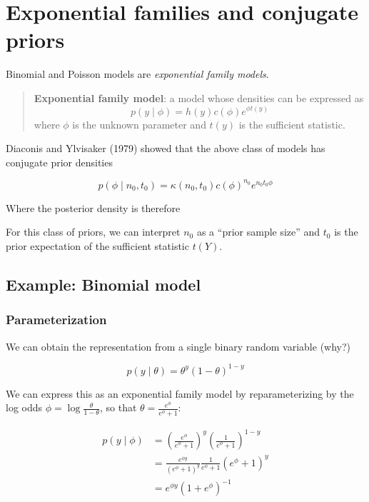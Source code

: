 \documentclass[]{article}
\begin{document}
\hypertarget{exponential-families-and-conjugate-priors}{%
\section{Exponential families and conjugate
priors}\label{exponential-families-and-conjugate-priors}}

Binomial and Poisson models are \emph{exponential family models}.

\begin{quote}
\textbf{Exponential family model}: a model whose densities can be
expressed as \[p(y \mid \phi) = h(y)c(\phi)e^{\phi t(y)}\] where
\(\phi\) is the unknown parameter and \(t(y)\) is the sufficient
statistic.
\end{quote}

Diaconis and Ylvisaker (1979) showed that the above class of models has
conjugate prior densities

\[p(\phi \mid n_0, t_0) = \kappa (n_0, t_0) c(\phi)^{n_0} e^{n_0 t_0 \phi}\]

Where the posterior density is therefore

For this class of priors, we can interpret \(n_0\) as a ``prior sample
size'' and \(t_0\) is the prior expectation of the sufficient statistic
\(t(Y)\).

\hypertarget{example-binomial-model}{%
\subsection{Example: Binomial model}\label{example-binomial-model}}

\hypertarget{parameterization}{%
\subsubsection{Parameterization}\label{parameterization}}

We can obtain the representation from a single binary random variable
(why?)

\[p(y \mid \theta) = \theta^{y} (1 - \theta)^{1 - y}\]

We can express this as an exponential family model by reparameterizing
by the log odds \(\phi = \log \frac{\theta}{1 - \theta}\), so that
\(\theta = \frac{e^\phi}{e^\phi + 1}\):

\begin{align}
p(y \mid \phi) &= \left( \frac{e^\phi}{e^\phi + 1} \right)^y \left(\frac{1}{e^\phi + 1} \right)^{1 - y} \\
&= \frac{e^{\phi y}}{(e^\phi + 1)^y} \frac{1}{e^\phi + 1} \left( e^\phi + 1\right)^y \\
&= e^{\phi y} (1 + e^\phi)^{-1} \\
\end{align}
\end{document}
